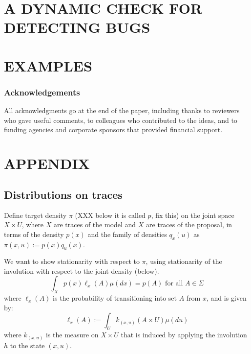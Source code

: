 \documentclass[twoside]{article}
\begin{document}


\section{A DYNAMIC CHECK FOR DETECTING BUGS}


\section{EXAMPLES}


\subsubsection*{Acknowledgements}
All acknowledgments go at the end of the paper, including thanks to reviewers who gave useful comments, to colleagues who contributed to the ideas, and to funding agencies and corporate sponsors that provided financial support.

 

\clearpage
\onecolumn
\section*{APPENDIX}

\subsection{Distributions on traces}
Define target density $\pi$ (XXX below it is called $p$, fix this) on the joint space $X \times U$, where $X$ are traces of the model and $X$ are traces of the proposal, in terms of the density $p(x)$ and the family of densities $q_x(u)$ as $\pi(x, u) := p(x) q_u(x)$.

We want to show stationarity with respect to $\pi$, using stationarity of the involution with respect to the joint density (below).
\begin{equation}
\int_X p(x) \ell_x(A) \mu(dx) = p(A) \mbox{ for all } A \in \Sigma
\end{equation}
where $\ell_x(A)$ is the probability of transitioning into set $A$ from $x$, and is given by:
\begin{equation}
\ell_x(A) := \int_U k_{(x, u)}(A \times U) \mu(du)
\end{equation}
where $k_{(x, u)}$ is the measure on $X \times U$ that is induced by applying the involution $h$ to the state $(x, u)$.
\end{document}
